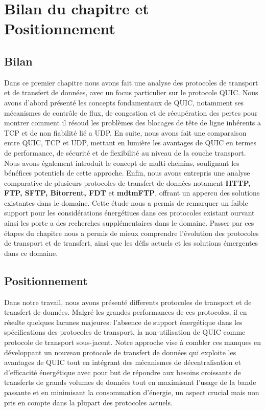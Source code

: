\section{Bilan du chapitre et Positionnement}

\subsection{Bilan}
Dans ce premier chapitre nous avons fait une analyse des protocoles de transport et de transfert de données, avec un focus particulier sur le protocole QUIC. Nous avons d'abord présenté les concepts fondamentaux de QUIC, notamment ses mécanismes de contrôle de flux, de congestion et de récupération des pertes pour montrer comment il résoud les problèmes des blocages de tête de ligne inhérents a TCP et de non fiabilité lié a UDP. En suite, nous avons fait une comparaison entre QUIC, TCP et UDP, mettant en lumière les avantages de QUIC en termes de performance, de sécurité et de flexibilité au niveau de la couche transport. Nous avons également introduit le concept de multi-chemins, soulignant les bénéfices potentiels de cette approche. Enfin, nous avons entrepris une analyse comparative de plusieurs protocoles de transfert de données notament \textbf{HTTP, FTP, SFTP, Bitorrent, FDT} et \textbf{mdtmFTP}, offrant un appercu des solutions existantes dans le domaine. Cette étude nous a permis de remarquer un faible support pour les considérations énergétiues dans ces protocoles existant ourvant ainsi les porte a des recherches supplémentaires dans le domaine. Passer par ces étapes du chapitre nous a permis de mieux comprendre l'évolution des protocoles de transport et de transfert, ainsi que les défis actuels et les solutions émergentes dans ce domaine. 

\subsection{Positionnement}

Dans notre travail, nous avons présenté differents protocoles de transport et de transfert de données. Malgré les grandes performances de ces protocoles, il en résulte quelques lacunes majeures: l'absence de support énergétique dans les spécifications des protocoles de transport, la non-utilisation de QUIC comme protocole de transport sous-jacent\cite{gridFTP, zhang2018mdtmftp, gien1978file}. Notre approche vise à combler ces manques en développant un nouveau protocole de transfert de données qui exploite les avantages de QUIC tout en intégrant des mécanismes de décentralisation et d'efficacité énergétique avec pour but de répondre aux besoins croissants de transferts de grands volumes de données tout en maximisant l'usage de la bande passante et en minimisant la consommation d'énergie, un aspect crucial mais non pris en compte dans la plupart des protocoles actuels.